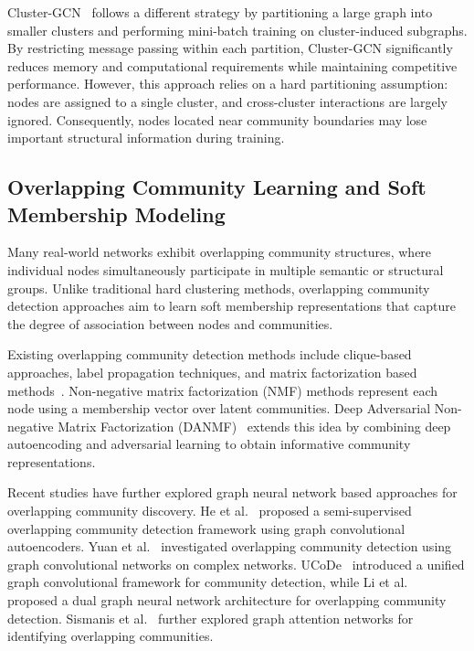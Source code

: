 \documentclass[a4paper,11pt,oneside,onecolumn,preprint]{elsarticle}
\numberwithin{equation}{section}
\begin{document}
Cluster-GCN~\cite{Cluster-GCN} follows a different strategy by partitioning a large graph into smaller clusters and performing mini-batch training on cluster-induced subgraphs.
By restricting message passing within each partition, Cluster-GCN significantly reduces memory and computational requirements while maintaining competitive performance.
However, this approach relies on a hard partitioning assumption: nodes are assigned to a single cluster, and cross-cluster interactions are largely ignored.
Consequently, nodes located near community boundaries may lose important structural information during training.

\subsection{Overlapping Community Learning and Soft Membership Modeling}

Many real-world networks exhibit overlapping community structures, where individual nodes simultaneously participate in multiple semantic or structural groups.
Unlike traditional hard clustering methods, overlapping community detection approaches aim to learn soft membership representations that capture the degree of association between nodes and communities.

Existing overlapping community detection methods include clique-based approaches, label propagation techniques, and matrix factorization based methods~\cite{Shang2014}.
Non-negative matrix factorization (NMF) methods represent each node using a membership vector over latent communities.
Deep Adversarial Non-negative Matrix Factorization (DANMF)~\cite{DANMF} extends this idea by combining deep autoencoding and adversarial learning to obtain informative community representations.

Recent studies have further explored graph neural network based approaches for overlapping community discovery.
He et al.~\cite{He2022} proposed a semi-supervised overlapping community detection framework using graph convolutional autoencoders.
Yuan et al.~\cite{Yuan2022} investigated overlapping community detection using graph convolutional networks on complex networks.
UCoDe~\cite{UCoDe2023} introduced a unified graph convolutional framework for community detection, while Li et al.~\cite{Li2023} proposed a dual graph neural network architecture for overlapping community detection.
Sismanis et al.~\cite{Sismanis2024} further explored graph attention networks for identifying overlapping communities.
\end{document}
